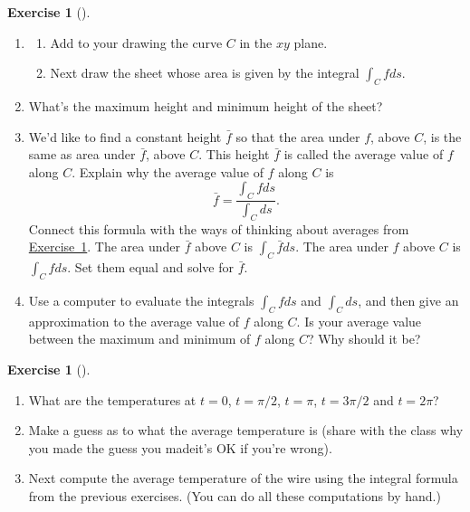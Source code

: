 \documentclass[10pt,]{book}
\theoremstyle{plain}
\theoremstyle{definition}
\theoremstyle{definition}
\theoremstyle{definition}
\theoremstyle{definition}
\newtheorem{exploration}[project]{Exercise}
\theoremstyle{definition}
\numberwithin{equation}{section}
\begin{document}
\begin{exploration}[]\label{Average_Value_intro}
\leavevmode%
\begin{enumerate}[font=\bfseries,label=(\alph*),ref=\alph*]
\item\label{task-548} \begin{enumerate}[font=\bfseries,label=(\roman*),ref=\theenumi.\roman*]
\item\label{task-549} Add to your drawing the curve \(C\) in the \(xy\) plane.%
\item\label{task-550} Next draw the sheet whose area is given by the integral \(\int_C f ds\).%
\end{enumerate}
\item\label{task-551} What's the maximum height and minimum height of the sheet?  %
\item\label{task-552} We'd like to find a constant height \(\bar f\) so that the area under \(f\), above \(C\), is the same as area under \(\bar f\), above \(C\). This height \(\bar f\) is called the average value of \(f\) along \(C\). Explain why the average value of \(f\) along \(C\) is%
\begin{equation*}
\bar f = \frac{\int_C f ds}{\int_C ds}.
\end{equation*}
Connect this formula with the ways of thinking about averages from \hyperref[average_value_methods]{Exercise~1}. The area under \(\bar f\) above \(C\) is \(\int_C \bar f ds\). The area under \(f\) above \(C\) is \(\int_C f ds\). Set them equal and solve for \(\bar f\).%
%
\item\label{task-553} Use a computer to evaluate the integrals \(\int_C f ds\) and \(\int_C ds\), and then give an approximation to the average value of \(f\) along \(C\). Is your average value between the maximum and minimum of \(f\) along \(C\)? Why should it be?%
\end{enumerate}
\end{exploration}
\begin{exploration}[]\label{exploration-214}
\leavevmode%
\begin{enumerate}[font=\bfseries,label=(\alph*),ref=\alph*]
\item\label{task-554} What are the temperatures at \(t=0\), \(t=\pi/2\), \(t=\pi\), \(t=3\pi/2\) and \(t=2\pi\)?%
\item\label{task-555} Make a guess as to what the average temperature is (share with the class why you made the guess you made\textemdash{}it's OK if you're wrong).%
\item\label{task-556} Next compute the average temperature of the wire using the integral formula from the previous exercises. (You can do all these computations by hand.)%
\end{enumerate}
\end{exploration}
\typeout{************************************************}
\typeout{************************************************}
\end{document}
